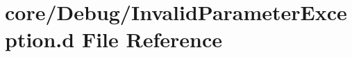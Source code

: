 \hypertarget{_invalid_parameter_exception_8d}{\section{core/\+Debug/\+Invalid\+Parameter\+Exception.d File Reference}
\label{_invalid_parameter_exception_8d}
}
